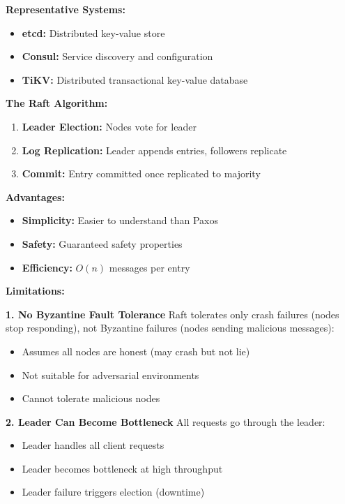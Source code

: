 \textbf{Representative Systems:}
\begin{itemize}
    \item \textbf{etcd:} Distributed key-value store
    \item \textbf{Consul:} Service discovery and configuration
    \item \textbf{TiKV:} Distributed transactional key-value database
\end{itemize}

\textbf{The Raft Algorithm:}
\begin{enumerate}
    \item \textbf{Leader Election:} Nodes vote for leader
    \item \textbf{Log Replication:} Leader appends entries, followers replicate
    \item \textbf{Commit:} Entry committed once replicated to majority
\end{enumerate}

\textbf{Advantages:}
\begin{itemize}
    \item \textbf{Simplicity:} Easier to understand than Paxos
    \item \textbf{Safety:} Guaranteed safety properties
    \item \textbf{Efficiency:} \(O(n)\) messages per entry
\end{itemize}

\textbf{Limitations:}

\textbf{1. No Byzantine Fault Tolerance}
Raft tolerates only crash failures (nodes stop responding), not Byzantine failures (nodes sending malicious messages):
\begin{itemize}
    \item Assumes all nodes are honest (may crash but not lie)
    \item Not suitable for adversarial environments
    \item Cannot tolerate malicious nodes
\end{itemize}

\textbf{2. Leader Can Become Bottleneck}
All requests go through the leader:
\begin{itemize}
    \item Leader handles all client requests
    \item Leader becomes bottleneck at high throughput
    \item Leader failure triggers election (downtime)
\end{itemize}

